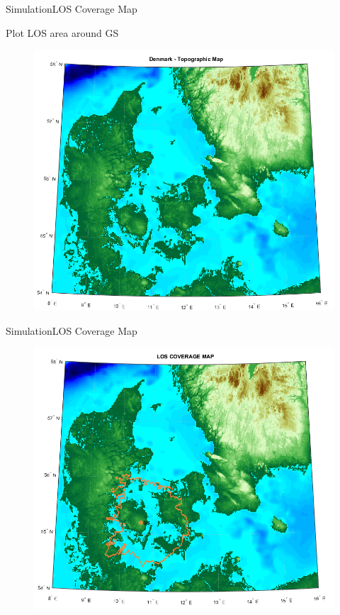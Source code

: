 \begin{frame}{Simulation}{LOS Coverage Map}
  \begin{block}{Plot LOS area around GS}
	\begin{figure}
    	\includegraphics[scale=0.33]{../report/figures/dk_map.png}
    \end{figure}
  \end{block}
\end{frame}

\begin{frame}{Simulation}{LOS Coverage Map} 
  	\begin{figure}
        \includegraphics[scale=0.40]{../report/figures/los_odense.png}
    \end{figure}
\end{frame}

